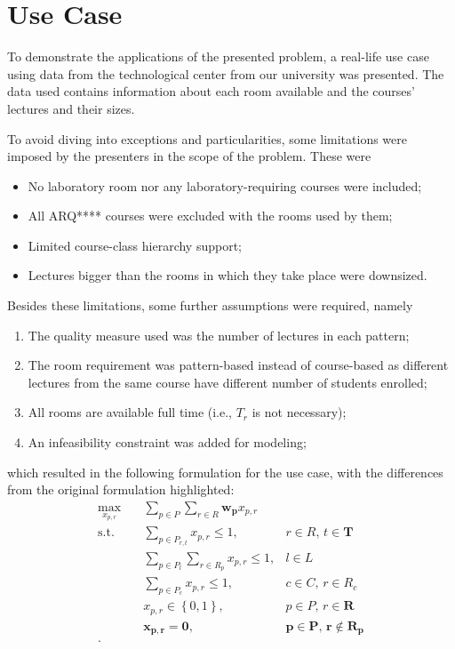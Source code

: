 \section{Use Case}

To demonstrate the applications of the presented problem, a real-life use case using data from the technological center from our university was presented. The data used contains information about each room available and the courses' lectures and their sizes.

To avoid diving into exceptions and particularities, some limitations were imposed by the presenters in the scope of the problem. These were
\begin{itemize}
    \item No laboratory room nor any laboratory-requiring courses were included;
    \item All ARQ**** courses were excluded with the rooms used by them;
    \item Limited course-class hierarchy support;
    \item Lectures bigger than the rooms in which they take place were downsized.
\end{itemize}

Besides these limitations, some further assumptions were required, namely
\begin{enumerate}
    \item The quality measure used was the number of lectures in each pattern;
    \item The room requirement was pattern-based instead of course-based as different lectures from the same course have different number of students enrolled;
    \item All rooms are available full time (i.e., $T_r$ is not necessary);
    \item An infeasibility constraint was added for modeling;
\end{enumerate}
which resulted in the following formulation for the use case, with the differences from the original formulation highlighted:
\begin{align*}
    \max_{x_{p,r}} \quad & \sum_{p \in P} \sum_{r\in R} \boldsymbol{w_{p}}x_{p,r} \\
    \textrm{s.t.} \quad & \sum_{p \in P_{r,t}} x_{p,r} \le 1, & r\in R,\,t\in \boldsymbol{T} \\
			& \sum_{p \in P_l} \sum_{r \in R_p} x_{p,r} \le 1, & l \in L \\
			& \sum_{p \in P_c} x_{p,r} \le 1, & c \in C,\, r \in R_c \\
			& x_{p,r} \in \left\{ 0,1 \right\}, & p \in P,\, r\in \boldsymbol{R} \\
			& \boldsymbol{x_{p,r}=0,} & \boldsymbol{p \in P,\, r \notin R_p} \\
.\end{align*}

